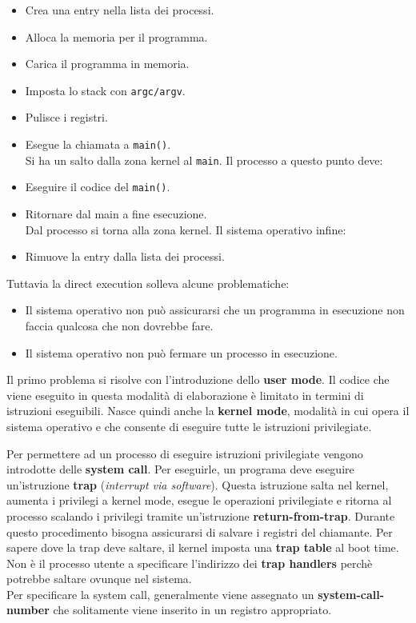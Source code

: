 \documentclass[12pt, twoside, letterpaper]{article}
\begin{document}
				\begin{itemize}
					\item Crea una entry nella lista dei processi.
					\item Alloca la memoria per il programma.
					\item Carica il programma in memoria.
					\item Imposta lo stack con \texttt{argc/argv}.
					\item Pulisce i registri.
					\item Esegue la chiamata a \texttt{main()}.\\
					Si ha un salto dalla zona kernel al \texttt{main}. Il processo a questo punto deve:
					\item Eseguire il codice del \texttt{main()}.
					\item Ritornare dal main a fine esecuzione.\\
					Dal processo si torna alla zona kernel. Il sistema operativo infine:
					\item Rimuove la entry dalla lista dei processi.
				\end{itemize}
				Tuttavia la direct execution solleva alcune problematiche:
				
				\begin{itemize}
					\item Il sistema operativo non può assicurarsi che un programma in esecuzione non faccia qualcosa che non dovrebbe fare.
					\item Il sistema operativo non può fermare un processo in esecuzione.
				\end{itemize}
				Il primo problema si risolve con l'introduzione dello \textbf{user mode}. Il codice che viene eseguito in questa modalità di elaborazione è limitato in termini di istruzioni eseguibili. Nasce quindi anche la \textbf{kernel mode}, modalità in cui opera il sistema operativo e che consente di eseguire tutte le istruzioni privilegiate.
				
				Per permettere ad un processo di eseguire istruzioni privilegiate vengono introdotte delle \textbf{system call}. Per eseguirle, un programa deve eseguire un'istruzione \textbf{trap} (\textit{interrupt via software}).	Questa istruzione salta nel kernel, aumenta i privilegi a kernel mode, esegue le operazioni privilegiate e ritorna al processo scalando i privilegi tramite un'istruzione \textbf{return-from-trap}. Durante questo procedimento bisogna assicurarsi di salvare i registri del chiamante. Per sapere dove la trap deve saltare, il kernel imposta una \textbf{trap table} al boot time. Non è il processo utente a specificare l'indirizzo dei \textbf{trap handlers} perchè potrebbe saltare ovunque nel sistema.\\
				Per specificare la system call, generalmente viene assegnato un \textbf{system-call-number} che solitamente viene inserito in un registro appropriato.
				
\end{document}
